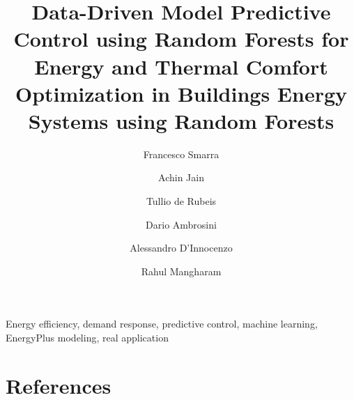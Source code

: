 \documentclass[review]{elsarticle}
\begin{document}
\begin{frontmatter}

\title{\textcolor[rgb]{0,0,1}{Data-Driven Model Predictive Control using Random Forests for Energy and Thermal Comfort Optimization in Buildings Energy Systems using Random Forests}}

\author[FSaddress,EC]{Francesco Smarra}

\author[AJaddress,EC]{Achin Jain}
\author[TDRaddress,EC]{Tullio de Rubeis}
\author[TDRaddress]{Dario Ambrosini}
\author[FSaddress]{Alessandro D'Innocenzo}
\author[AJaddress]{Rahul Mangharam}


\address[FSaddress]{Department of Information Engineering, Computer Science and Mathematics, Universit\`{a} degli Studi dell'Aquila, L'Aquila, Italy}
\address[AJaddress]{Department of Electrical and Systems Engineering, University of Pennsylvania, Philadelphia, USA}
\address[TDRaddress]{"G. Parolini Lab" - Department of Industrial and Information Engineering and Economics, Universit\`{a} degli Studi dell'Aquila, L'Aquila, Italy}


\begin{abstract}

\end{abstract}

\begin{keyword}
Energy efficiency, demand response, predictive control, machine learning, EnergyPlus modeling, real application
\end{keyword}

\end{frontmatter}
















\section*{References}



\appendix

\end{document}
